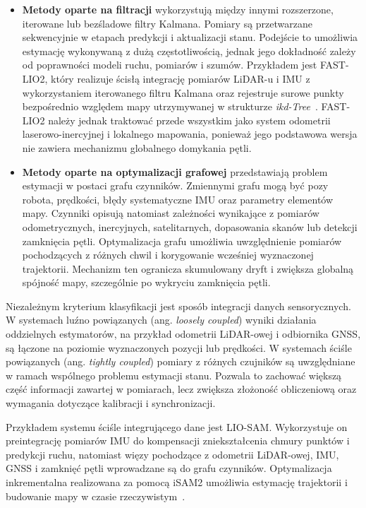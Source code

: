 \documentclass[a4paper,twoside,12pt]{book}
\begin{document}
\begin{itemize}
    \item \textbf{Metody oparte na filtracji} wykorzystują między innymi rozszerzone, iterowane lub bezśladowe filtry Kalmana. Pomiary są przetwarzane sekwencyjnie w etapach predykcji i aktualizacji stanu. Podejście to umożliwia estymację wykonywaną z dużą częstotliwością, jednak jego dokładność zależy od poprawności modeli ruchu, pomiarów i szumów. Przykładem jest FAST-LIO2, który realizuje ścisłą integrację pomiarów LiDAR-u i IMU z wykorzystaniem iterowanego filtru Kalmana oraz rejestruje surowe punkty bezpośrednio względem mapy utrzymywanej w strukturze \textit{ikd-Tree}~\cite{xu2021fastlio2}. FAST-LIO2 należy jednak traktować przede wszystkim jako system odometrii laserowo-inercyjnej i lokalnego mapowania, ponieważ jego podstawowa wersja nie zawiera mechanizmu globalnego domykania pętli.

    \item \textbf{Metody oparte na optymalizacji grafowej} przedstawiają problem estymacji w postaci grafu czynników. Zmiennymi grafu mogą być pozy robota, prędkości, błędy systematyczne IMU oraz parametry elementów mapy. Czynniki opisują natomiast zależności wynikające z pomiarów odometrycznych, inercyjnych, satelitarnych, dopasowania skanów lub detekcji zamknięcia pętli. Optymalizacja grafu umożliwia uwzględnienie pomiarów pochodzących z różnych chwil i korygowanie wcześniej wyznaczonej trajektorii. Mechanizm ten ogranicza skumulowany dryft i zwiększa globalną spójność mapy, szczególnie po wykryciu zamknięcia pętli.
\end{itemize}

Niezależnym kryterium klasyfikacji jest sposób integracji danych sensorycznych. W systemach luźno powiązanych (ang. \textit{loosely coupled}) wyniki działania oddzielnych estymatorów, na przykład odometrii LiDAR-owej i odbiornika GNSS, są łączone na poziomie wyznaczonych pozycji lub prędkości. W systemach ściśle powiązanych (ang. \textit{tightly coupled}) pomiary z różnych czujników są uwzględniane w ramach wspólnego problemu estymacji stanu. Pozwala to zachować większą część informacji zawartej w pomiarach, lecz zwiększa złożoność obliczeniową oraz wymagania dotyczące kalibracji i synchronizacji.

Przykładem systemu ściśle integrującego dane jest LIO-SAM. Wykorzystuje on preintegrację pomiarów IMU do kompensacji zniekształcenia chmury punktów i predykcji ruchu, natomiast więzy pochodzące z odometrii LiDAR-owej, IMU, GNSS i zamknięć pętli wprowadzane są do grafu czynników. Optymalizacja inkrementalna realizowana za pomocą iSAM2 umożliwia estymację trajektorii i budowanie mapy w czasie rzeczywistym~\cite{9341176}.
\end{document}
